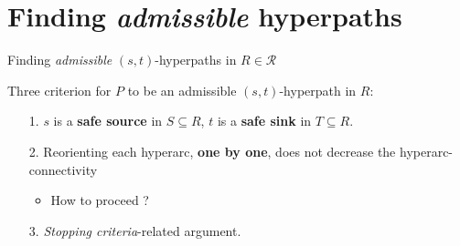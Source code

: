 \documentclass[10pt, aspectratio=43,compress]{beamer}
\begin{document}
	\section{Finding \textit{admissible} hyperpaths}
	\begin{frame}{Finding \textit{admissible} $(s, t)$-hyperpaths in $R\in\mathcal{R}$}

		\begin{tcolorbox}[colback=darkseagreen!5!white,colframe=darkseagreen!75!black,title=Admissible hyperpaths]
			Three criterion for $P$ to be an admissible $(s, t)$-hyperpath in $R$:	
			\begin{itemize}
				\item[1.] $s$ is a \textbf{safe source} in $S\subseteq{R}$, $t$ is a \textbf{safe sink} in $T\subseteq{R}$.
				\item[2.] Reorienting each hyperarc, \textbf{one by one}, does not decrease the hyperarc-connectivity{\begin{itemize}\item How to proceed ?\end{itemize}}
				\item[3.] \textit{Stopping criteria}-related argument.
			\end{itemize}
		\end{tcolorbox}
	\end{frame}
\end{document}

